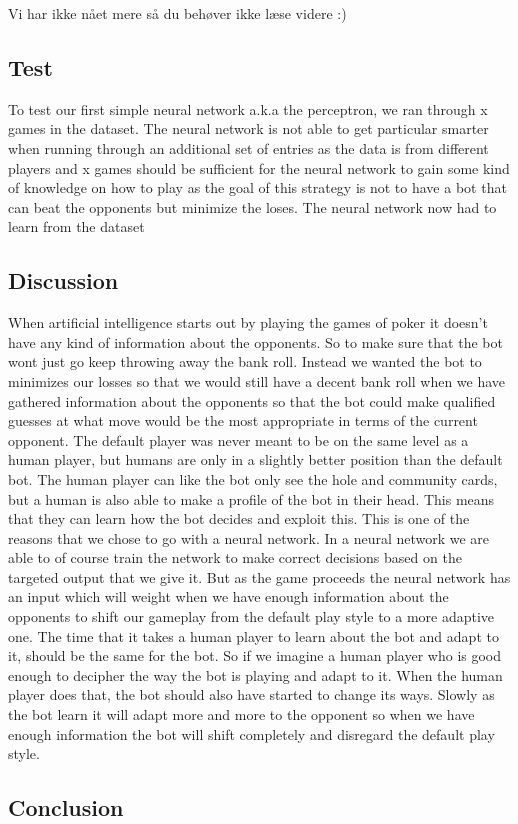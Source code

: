 

Vi har ikke nået mere så du behøver ikke læse videre :)

\subsection{Test}
To test our first simple neural network a.k.a the perceptron, we ran through x games in the dataset. The neural network is not able to get particular smarter when running through an additional set of entries as the data is from different players and x games should be sufficient for the neural network to gain some kind of knowledge on how to play as the goal of this strategy is not to have a bot that can beat the opponents but minimize the loses.
The neural network now had to learn from the dataset 

\subsection{Discussion}
When artificial intelligence starts out by playing the games of poker it doesn't have any kind of information about the opponents. So to make sure that the bot wont just go keep throwing away the bank roll. Instead we wanted the bot to minimizes our losses so that we would still have a decent bank roll when we have gathered information about the opponents so that the bot could make qualified guesses at what move would be the most appropriate in terms of the current opponent. The default player was never meant to be on the same level as a human player, but humans are only in a slightly better position than the default bot. The human player can like the bot only see the hole and community cards, but a human is also able to make a profile of the bot in their head. This means that they can learn how the bot decides and exploit this. 
This is one of the reasons that we chose to go with a neural network. In a neural network we are able to of course train the network to make correct decisions based on the targeted output that we give it.
But as the game proceeds the neural network has an input which will weight when we have enough information about the opponents to shift our gameplay from the default play style to a more adaptive one.
The time that it takes a human player to learn about the bot and adapt to it, should be the same for the bot. So if we imagine a human player who is good enough to decipher the way the bot is playing and adapt to it. When the human player does that, the bot should also have started to change its ways. Slowly as the bot learn it will adapt more and more to the opponent so when we have enough information the bot will shift completely and disregard the default play style.
\subsection{Conclusion}